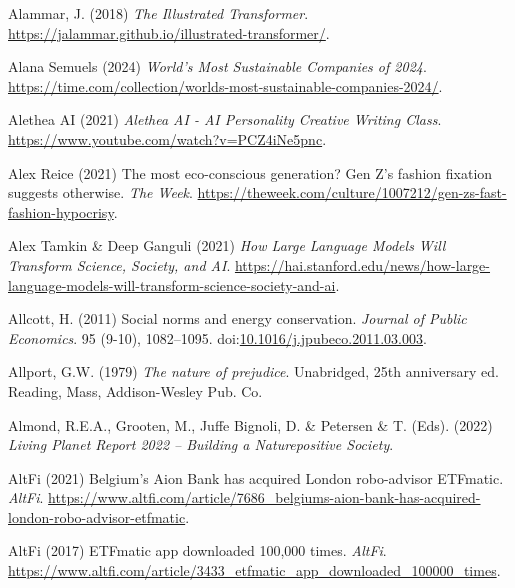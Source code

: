 \documentclass[
  letterpaper,
  DIV=11,
  numbers=noendperiod]{scrartcl}
\newlength{\cslhangindent}
\newenvironment{CSLReferences}[2] %
 {\begin{list}{}{%
  \setlength{\itemindent}{0pt}
  \setlength{\leftmargin}{0pt}
  \setlength{\parsep}{0pt}
  \ifodd #1
   \setlength{\leftmargin}{\cslhangindent}
   \setlength{\itemindent}{-1\cslhangindent}
  \fi
  \setlength{\itemsep}{#2\baselineskip}}}
 {\end{list}}
\begin{document}
\begin{CSLReferences}{0}{1}
Alammar, J. (2018) \emph{The {Illustrated Transformer}}.
\url{https://jalammar.github.io/illustrated-transformer/}.

Alana Semuels (2024) \emph{World's {Most Sustainable Companies} of
2024}.
\url{https://time.com/collection/worlds-most-sustainable-companies-2024/}.

Alethea AI (2021) \emph{Alethea {AI} - {AI Personality Creative Writing
Class}}. \url{https://www.youtube.com/watch?v=PCZ4iNe5pnc}.

Alex Reice (2021) The most eco-conscious generation? {Gen Z}'s fashion
fixation suggests otherwise. \emph{The Week}.
\url{https://theweek.com/culture/1007212/gen-zs-fast-fashion-hypocrisy}.

Alex Tamkin \& Deep Ganguli (2021) \emph{How {Large Language Models Will
Transform Science}, {Society}, and {AI}}.
\url{https://hai.stanford.edu/news/how-large-language-models-will-transform-science-society-and-ai}.

Allcott, H. (2011) Social norms and energy conservation. \emph{Journal
of Public Economics}. 95 (9-10), 1082--1095.
doi:\href{https://doi.org/10.1016/j.jpubeco.2011.03.003}{10.1016/j.jpubeco.2011.03.003}.

Allport, G.W. (1979) \emph{The nature of prejudice}. Unabridged, 25th
anniversary ed. Reading, Mass, Addison-Wesley Pub. Co.

Almond, R.E.A., Grooten, M., Juffe Bignoli, D. \& Petersen \& T. (Eds).
(2022) \emph{Living {Planet Report} 2022 -- {Building} a {Naturepositive
Society}}.

AltFi (2021) Belgium's {Aion Bank} has acquired {London} robo-advisor
{ETFmatic}. \emph{AltFi}.
\url{https://www.altfi.com/article/7686_belgiums-aion-bank-has-acquired-london-robo-advisor-etfmatic}.

AltFi (2017) {ETFmatic} app downloaded 100,000 times. \emph{AltFi}.
\url{https://www.altfi.com/article/3433_etfmatic_app_downloaded_100000_times}.


\end{CSLReferences}
\end{document}
